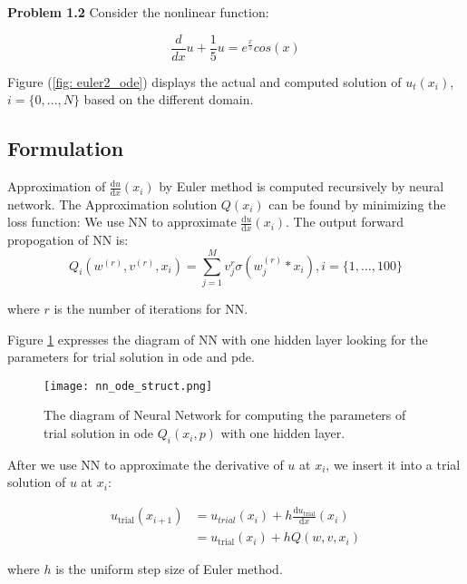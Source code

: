 \documentclass{article}
\begin{document}
	\medspace \noindent
	\textbf{Problem 1.2} Consider the nonlinear function:
	
	\[\frac{d}{dx} u + \frac{1}{5} u = e^{\frac{x}{5}}cos(x)\]

	\medspace \noindent
	Figure (\ref{fig: euler2_ode}) displays the actual and computed solution of $u _t(x_i)$, $i=\{0, \dots, N\}$ based on the different domain.
	
	\subsection{Formulation}

	Approximation of $\frac{\mathrm{d}u}{\mathrm{d}x}(x_i)$ by Euler method is computed recursively by neural network. 
	The Approximation solution $Q(x_i)$ can be found by minimizing the loss function:
	We use NN to approximate $\frac{\mathrm{d}u}{\mathrm{d}x}(x_i)$. The output forward propogation of NN is:
	\begin{equation}
	Q_i (w^{(r)},v^{(r)},x_i)=  \sum_{j=1}^{M}  v_{j}^{r}\sigma (w_{j}^{(r)}*x_i), i = \{1, \dots, 100\}
	\end{equation}
	
	\medspace \noindent
	where $r$ is the number of iterations for NN. 
	
	\medspace \noindent
	Figure \ref{fig:nn_ode_struct} expresses the diagram of NN with one hidden layer looking for the parameters for trial solution in ode and pde. 
		\begin{figure}[h]
		\centering
		\texttt{[image: nn\_ode\_struct.png]}
		\caption{The diagram of Neural Network for computing the parameters of trial solution in ode $Q_{i}(x_i,p)$ with one hidden layer. }
		\label{fig:nn_ode_struct}
	\end{figure}
	\medspace \noindent
	After we use NN to approximate the derivative of $u$ at $x_i$, we insert it into a trial solution of $u$ at $x_i$:  
	
	\begin{equation}
	\begin{aligned}
	u_{\text{trial}}(x_{i+1}) &= u_{trial}(x_{i}) +h\frac{\mathrm{d}u_{\text{trial}}}{\mathrm{d}x}(x_i) \\
	&=  u_{\text{trial}}(x_{i}) +hQ(w,v,x_i)
	\end{aligned}
	\end{equation}
	
	\medspace \noindent
	where $h$ is the uniform step size of Euler method.  
   
\end{document}
